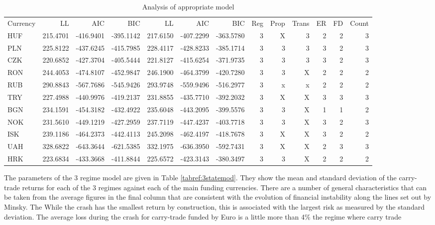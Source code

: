\documentclass[12pt, a4paper, oneside]{article} %
\begin{document}
\begin{landscape}
\begin{table}[ht]
\centering
\begin{tabular}{lrrrrrrrrrrrr}
  \hline
  Currency & LL & AIC & BIC & LL & AIC & BIC & Reg & Prop & Trans & ER & FD & Count\\
HUF &215.4701 &-416.9401 &-395.1142 &217.6150 &-407.2299 &-363.5780 &3&X&3&2&2&3\\
PLN &225.8122 &-437.6245 &-415.7985 &228.4117 &-428.8233 &-385.1714 &3&3&3&3&2&3\\
CZK &220.6852 &-427.3704 &-405.5444 &221.8127 &-415.6254 &-371.9735 &3&3&3&3&2&3\\
RON &244.4053 &-474.8107 &-452.9847 &246.1900 &-464.3799 &-420.7280 &3&3&X&2&2&2\\
RUB &290.8843 &-567.7686 &-545.9426 &293.9748 &-559.9496 &-516.2977 &3&x&x&2&2&2\\
TRY &227.4988 &-440.9976 &-419.2137 &231.8855 &-435.7710 &-392.2032 &3&X&X&3&3&3\\
BGN &234.1591 &-454.3182 &-432.4922 &235.6048 &-443.2095 &-399.5576 &3&3&X&1&1&2\\
NOK &231.5610 &-449.1219 &-427.2959 &237.7119 &-447.4237 &-403.7718 &3&3&X&3&2&3\\
ISK &239.1186 &-464.2373 &-442.4113 &245.2098 &-462.4197 &-418.7678 &3&X&X&3&2&2\\
UAH &328.6822 &-643.3644 &-621.5385 &332.1975 &-636.3950 &-592.7431 &3&X&X&2&3&3\\
HRK &223.6834 &-433.3668 &-411.8844 &225.6572 &-423.3143 &-380.3497 &3&3&X&2&2&2\\
\end{tabular}
\caption{Analysis of appropriate model}
\label{tabref:AM}
\end{table}
\end{landscape}


The parameters of the 3 regime model are given in Table \ref{tabref:3statemod}.  They show the mean and standard deviation of the carry-trade returns for each of the 3 regimes against each of the main funding currencies.  There are a number of general characteristics that can be taken from the average figures in the final column that are consistent with the evolution of financial instability along the lines set out by Minsky.  The While the crash has the smallest return by construction, this is associated with the largest risk as measured by the standard deviation. The average loss during the crash for carry-trade funded by Euro is a little more than 4\%  the regime where carry trade 
\end{document}
